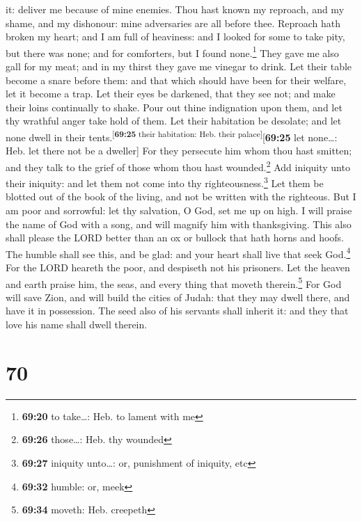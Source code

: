 it: deliver me because of mine enemies.  Thou hast known
my reproach, and my shame, and my dishonour: mine adversaries are all
before thee.  Reproach hath broken my heart; and I am
full of heaviness: and I looked for some to take pity, but there was
none; and for comforters, but I found none.\footnote{\textbf{69:20} to
  take\ldots: Heb. to lament with me}  They gave me also
gall for my meat; and in my thirst they gave me vinegar to drink.
 Let their table become a snare before them: and that
which should have been for their welfare, let it become a trap.
 Let their eyes be darkened, that they see not; and make
their loins continually to shake.  Pour out thine
indignation upon them, and let thy wrathful anger take hold of them.
 Let their habitation be desolate; and let none dwell in
their tents.\textsuperscript{{[}\textbf{69:25} their habitation: Heb.
their palace{]}}{[}\textbf{69:25} let none\ldots: Heb. let there not be
a dweller{]}  For they persecute him whom thou hast
smitten; and they talk to the grief of those whom thou hast
wounded.\footnote{\textbf{69:26} those\ldots: Heb. thy wounded}
 Add iniquity unto their iniquity: and let them not come
into thy righteousness.\footnote{\textbf{69:27} iniquity unto\ldots: or,
  punishment of iniquity, etc}  Let them be blotted out
of the book of the living, and not be written with the righteous.
 But I am poor and sorrowful: let thy salvation, O God,
set me up on high.  I will praise the name of God with a
song, and will magnify him with thanksgiving.  This also
shall please the LORD better than an ox or bullock that hath horns and
hoofs.  The humble shall see this, and be glad: and your
heart shall live that seek God.\footnote{\textbf{69:32} humble: or, meek}
 For the LORD heareth the poor, and despiseth not his
prisoners.  Let the heaven and earth praise him, the
seas, and every thing that moveth therein.\footnote{\textbf{69:34}
  moveth: Heb. creepeth}  For God will save Zion, and
will build the cities of Judah: that they may dwell there, and have it
in possession.  The seed also of his servants shall
inherit it: and they that love his name shall dwell therein.

\hypertarget{section-69}{%
\section{70}\label{section-69}}

